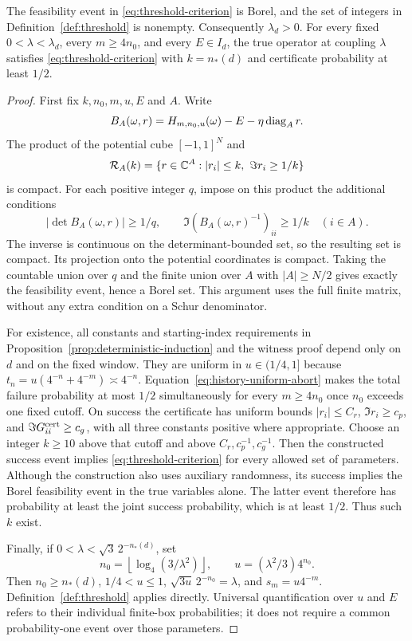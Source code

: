 \begin{proposition}
\label{prop:threshold}
The feasibility event in \eqref{eq:threshold-criterion} is Borel, and
the set of integers in Definition~\ref{def:threshold} is nonempty.
Consequently $\lambda_d>0$. For every fixed $0<\lambda<\lambda_d$,
every $m\ge4n_0$, and every $E\in I_d$, the true operator at coupling
$\lambda$ satisfies \eqref{eq:threshold-criterion} with
$k=n_*(d)$ and certificate probability at least $1/2$.
\end{proposition}

\begin{proof}
First fix $k,n_0,m,u,E$ and $A$. Write
\[
 B_A(\omega,r)=H_{m,n_0,u}(\omega)-E-\eta\operatorname{diag}_A r.
\]
The product of the potential cube $[-1,1]^N$ and
\[
 \mathcal R_A(k)=\{r\in\mathbb C^A:|r_i|\le k,\ \Im r_i\ge1/k\}
\]
is compact. For each positive integer $q$, impose on this product
the additional conditions
\[
 |\det B_A(\omega,r)|\ge1/q,
 \qquad \Im(B_A(\omega,r)^{-1})_{ii}\ge1/k\quad(i\in A).
\]
The inverse is continuous on the determinant-bounded set, so the
resulting set is compact. Its projection onto the potential coordinates
is compact. Taking the countable union over $q$ and the finite union
over $A$ with $|A|\ge N/2$ gives exactly the feasibility event, hence a
Borel set. This argument uses the full finite matrix, without any
extra condition on a Schur denominator.

For existence, all constants and starting-index requirements in
Proposition~\ref{prop:deterministic-induction} and the witness proof
depend only on $d$ and on the fixed window. They are uniform in
$u\in(1/4,1]$ because $t_n=u(4^{-n}+4^{-m})\asymp4^{-n}$.
Equation~\eqref{eq:history-uniform-abort} makes the total failure
probability at most $1/2$ simultaneously for every $m\ge4n_0$ once
$n_0$ exceeds one fixed cutoff. On success the certificate has uniform
bounds $|r_i|\le C_r$, $\Im r_i\ge c_p$, and
$\Im G_{ii}^{\rm cert}\ge c_g$, with all three constants positive
where appropriate. Choose an integer $k\ge10$ above that cutoff and
above $C_r,c_p^{-1},c_g^{-1}$. Then the constructed success event implies
\eqref{eq:threshold-criterion} for every allowed set of parameters.
Although the construction also uses auxiliary randomness, its success
implies the Borel feasibility event in the true variables alone.
The latter event therefore has probability at least the joint success
probability, which is at least $1/2$. Thus such $k$ exist.

Finally, if $0<\lambda<\sqrt3\,2^{-n_*(d)}$, set
\[
 n_0=\left\lfloor\log_4(3/\lambda^2)\right\rfloor,
 \qquad u=(\lambda^2/3)4^{n_0}.
\]
Then $n_0\ge n_*(d)$, $1/4<u\le1$,
$\sqrt{3u}\,2^{-n_0}=\lambda$, and $s_m=u4^{-m}$.
Definition~\ref{def:threshold} applies directly. Universal quantification
over $u$ and $E$ refers to their individual finite-box probabilities;
it does not require a common probability-one event over those parameters.
\end{proof}

